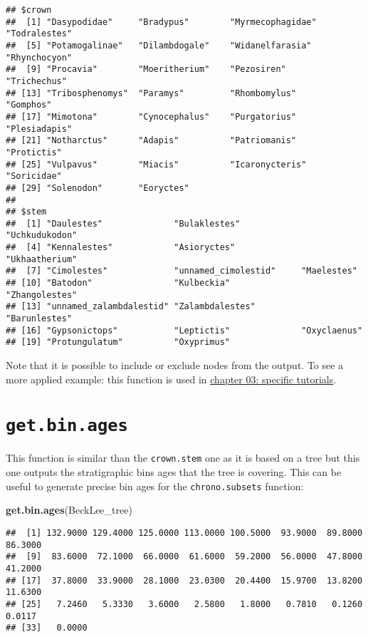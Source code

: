 \documentclass[
]{book}
\newenvironment{Shaded}{\begin{snugshade}}{\end{snugshade}}
\newcommand{\KeywordTok}[1]{\textcolor[rgb]{0.13,0.29,0.53}{\textbf{#1}}}
\newcommand{\NormalTok}[1]{#1}
\begin{document}
\begin{verbatim}
## $crown
##  [1] "Dasypodidae"     "Bradypus"        "Myrmecophagidae" "Todralestes"    
##  [5] "Potamogalinae"   "Dilambdogale"    "Widanelfarasia"  "Rhynchocyon"    
##  [9] "Procavia"        "Moeritherium"    "Pezosiren"       "Trichechus"     
## [13] "Tribosphenomys"  "Paramys"         "Rhombomylus"     "Gomphos"        
## [17] "Mimotona"        "Cynocephalus"    "Purgatorius"     "Plesiadapis"    
## [21] "Notharctus"      "Adapis"          "Patriomanis"     "Protictis"      
## [25] "Vulpavus"        "Miacis"          "Icaronycteris"   "Soricidae"      
## [29] "Solenodon"       "Eoryctes"       
## 
## $stem
##  [1] "Daulestes"              "Bulaklestes"            "Uchkudukodon"          
##  [4] "Kennalestes"            "Asioryctes"             "Ukhaatherium"          
##  [7] "Cimolestes"             "unnamed_cimolestid"     "Maelestes"             
## [10] "Batodon"                "Kulbeckia"              "Zhangolestes"          
## [13] "unnamed_zalambdalestid" "Zalambdalestes"         "Barunlestes"           
## [16] "Gypsonictops"           "Leptictis"              "Oxyclaenus"            
## [19] "Protungulatum"          "Oxyprimus"
\end{verbatim}

Note that it is possible to include or exclude nodes from the output.
To see a more applied example: this function is used in \protect\hyperlink{custom-subsets}{chapter 03: specific tutorials}.

\hypertarget{get.bin.ages}{%
\section{\texorpdfstring{\texttt{get.bin.ages}}{get.bin.ages}}\label{get.bin.ages}}

This function is similar than the \texttt{crown.stem} one as it is based on a tree but this one outputs the stratigraphic bins ages that the tree is covering.
This can be useful to generate precise bin ages for the \texttt{chrono.subsets} function:

\begin{Shaded}
\begin{Highlighting}[]
\KeywordTok{get.bin.ages}\NormalTok{(BeckLee\_tree)}
\end{Highlighting}
\end{Shaded}

\begin{verbatim}
##  [1] 132.9000 129.4000 125.0000 113.0000 100.5000  93.9000  89.8000  86.3000
##  [9]  83.6000  72.1000  66.0000  61.6000  59.2000  56.0000  47.8000  41.2000
## [17]  37.8000  33.9000  28.1000  23.0300  20.4400  15.9700  13.8200  11.6300
## [25]   7.2460   5.3330   3.6000   2.5800   1.8000   0.7810   0.1260   0.0117
## [33]   0.0000
\end{verbatim}
\end{document}
